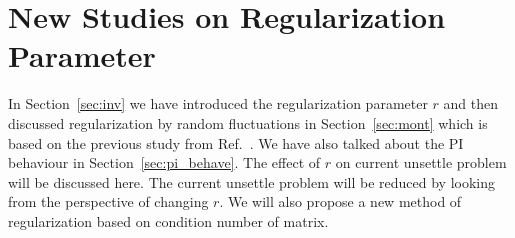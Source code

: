 % 









\section{New Studies on Regularization Parameter}\label{sec:new_study_r}

In Section~\ref{sec:inv} we have introduced the regularization parameter $r$ and then discussed regularization by random fluctuations in Section~\ref{sec:mont} which is based on the previous study from Ref.~\cite{bea}. We have also talked about the PI behaviour in Section~\ref{sec:pi_behave}. The effect of $r$ on current unsettle problem will be discussed here. The current unsettle problem will be reduced by looking from the perspective of changing $r$. We will also propose a new method of regularization based on condition number of matrix. 



